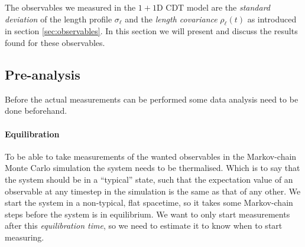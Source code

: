 The observables we measured in the $1 + 1$D CDT model are the \emph{standard deviation} of the length profile $\sigma_\ell$ and the \emph{length covariance} $\rho_\ell(t)$ as introduced in section \ref{sec:observables}.
In this section we will present and discuss the results found for these observables.

\subsection{Pre-analysis}
Before the actual measurements can be performed some data analysis need to be done beforehand.

\paragraph{Equilibration}
To be able to take measurements of the wanted observables in the Markov-chain Monte Carlo simulation the system needs to be thermalised. Which is to say that the system should be in a ``typical'' state, such that the expectation value of an observable at any timestep in the simulation is the same as that of any other.
We start the system in a non-typical, flat spacetime, so it takes some Markov-chain steps before the system is in equilibrium.
We want to only start measurements after this \emph{equilibration time}, so we need to estimate it to know when to start measuring.

